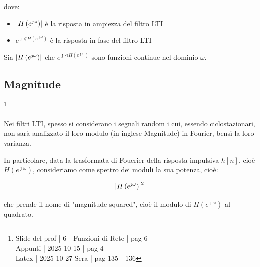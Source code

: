 dove: 

\begin{itemize}
    \item $\abs{H \left( e^{\jmath \omega}\right)}$ è la risposta in ampiezza del filtro LTI 
    \item $e^{\jmath \sphericalangle H \left( e^{\jmath \omega}\right)}$ è la risposta in fase del filtro LTI
\end{itemize}

Sia $\abs{H \left( e^{\jmath \omega}\right)}$ che $e^{\jmath \sphericalangle H \left( e^{\jmath \omega}\right)}$ sono funzioni continue nel dominio $\omega$. \newline 

\newpage 

\subsection{Magnitude} \label{subsec: Magnitude}

\footnote{ 
    Slide del prof | 6 - Funzioni di Rete | pag 6\\
    Appunti | 2025-10-15 | pag 4 \\ 
    Latex | 2025-10-27 Sera | pag 135 - 136 
}

Nei filtri LTI, spesso si considerano i segnali random i cui, essendo ciclostazionari, 
non sarà analizzato il loro modulo (in inglese Magnitude) in Fourier, bensì la loro varianza. \newline 

In particolare, data la trasformata di Fouerier della risposta impulsiva $h \left[ n\right]$, 
cioè $H \left( e^{\jmath \omega}\right)$, consideriamo come spettro dei moduli la sua potenza, cioè: 

{
    \Large 
    \begin{equation}
        \abs{H \left( e^{\jmath \omega}\right)}^{2}
    \end{equation}
}

che prende il nome di "magnitude-squared", cioè il modulo di $H \left( e^{\jmath \omega}\right)$ al quadrato. \newline 

